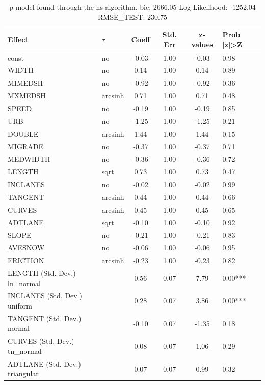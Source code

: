 \begin{table}
	\caption{p model found through the hs algorithm. bic: 2666.05 Log-Likelihood: -1252.04 RMSE_TEST: 230.75}
	\begin{center}
		\begin{tabular}{|l|l|c|c|c|l|}
			\hline
			Effect & $\tau$ & Coeff & Std. Err & z-values & Prob |z|>Z \\
			\hline
			const & no & -0.03 & 1.00 & -0.03 & 0.98 \\
			\hline
			WIDTH & no & 0.14 & 1.00 & 0.14 & 0.89 \\
			\hline
			MIMEDSH & no & -0.92 & 1.00 & -0.92 & 0.36 \\
			\hline
			MXMEDSH & arcsinh & 0.71 & 1.00 & 0.71 & 0.48 \\
			\hline
			SPEED & no & -0.19 & 1.00 & -0.19 & 0.85 \\
			\hline
			URB & no & -1.25 & 1.00 & -1.25 & 0.21 \\
			\hline
			DOUBLE & arcsinh & 1.44 & 1.00 & 1.44 & 0.15 \\
			\hline
			MIGRADE & no & -0.37 & 1.00 & -0.37 & 0.71 \\
			\hline
			MEDWIDTH & no & -0.36 & 1.00 & -0.36 & 0.72 \\
			\hline
			LENGTH & sqrt & 0.73 & 1.00 & 0.73 & 0.47 \\
			\hline
			INCLANES & no & -0.02 & 1.00 & -0.02 & 0.99 \\
			\hline
			TANGENT & arcsinh & 0.44 & 1.00 & 0.44 & 0.66 \\
			\hline
			CURVES & arcsinh & 0.45 & 1.00 & 0.45 & 0.65 \\
			\hline
			ADTLANE & sqrt & -0.10 & 1.00 & -0.10 & 0.92 \\
			\hline
			SLOPE & no & -0.21 & 1.00 & -0.21 & 0.83 \\
			\hline
			AVESNOW & no & -0.06 & 1.00 & -0.06 & 0.95 \\
			\hline
			FRICTION & arcsinh & -0.23 & 1.00 & -0.23 & 0.82 \\
			\hline
			LENGTH (Std. Dev.) ln_normal &  & 0.56 & 0.07 & 7.79 & 0.00*** \\
			\hline
			INCLANES (Std. Dev.) uniform &  & 0.28 & 0.07 & 3.86 & 0.00*** \\
			\hline
			TANGENT (Std. Dev.) normal &  & -0.10 & 0.07 & -1.35 & 0.18 \\
			\hline
			CURVES (Std. Dev.) tn_normal &  & 0.08 & 0.07 & 1.06 & 0.29 \\
			\hline
			ADTLANE (Std. Dev.) triangular &  & 0.07 & 0.07 & 0.99 & 0.32 \\

\end{tabular}
\end{center}
\end{table}
